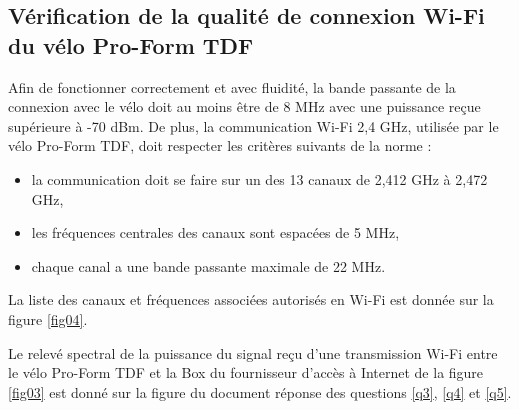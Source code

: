 \subsection{Vérification de la qualité de connexion Wi-Fi du vélo Pro-Form TDF}


Afin de fonctionner correctement et avec fluidité, la bande passante de la connexion avec le vélo doit au moins être de 8 MHz avec une puissance reçue supérieure à -70 dBm. De plus, la communication Wi-Fi 2,4 GHz, utilisée par le vélo Pro-Form TDF, doit respecter les critères suivants de la norme :
\begin{itemize}
 \item la communication doit se faire sur un des 13 canaux de 2,412 GHz à 2,472 GHz,
 \item les fréquences centrales des canaux sont espacées de 5 MHz,
 \item chaque canal a une bande passante maximale de 22 MHz.
\end{itemize}

La liste des canaux et fréquences associées autorisés en Wi-Fi est donnée sur la figure \ref{fig04}.


Le relevé spectral de la puissance du signal reçu d'une transmission Wi-Fi entre le vélo Pro-Form TDF et la Box du fournisseur d'accès à Internet de la figure \ref{fig03} est donné sur la figure du document réponse des questions \ref{q3}, \ref{q4} et \ref{q5}.




